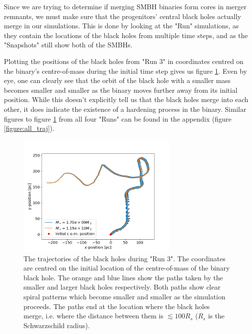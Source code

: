 \documentclass[english, oneside]{HYgradu}
\begin{document}
Since we are trying to determine if merging SMBH binaries form cores in merger remnants, we must make sure that the progenitors' central black holes actually merge in our simulations. This is done by looking at the "Run" simulations, as they contain the locations of the black holes from multiple time steps, and as the "Snapshots" still show both of the SMBHs.

Plotting the positions of the black holes from "Run 3" in coordinates centred on the binary's centre-of-mass during the initial time step gives us figure \ref{figure:run3_traj}. Even by eye, one can clearly see that the orbit of the black hole with a smaller mass becomes smaller and smaller as the binary moves further away from its initial position. While this doesn't explicitly tell us that the black holes merge into each other, it does indicate the existence of a hardening process in the binary. Similar figures to figure \ref{figure:run3_traj} from all four "Runs" can be found in the appendix (figure \ref{figure:all_traj}).

\begin{figure}[h]
	\centering	
	\includegraphics[width=0.7\textwidth]{Run3_Trajectory.png}	
	\caption{The trajectories of the black holes during "Run 3". The coordinates are centred on the initial location of the centre-of-mass of the binary black hole. The orange and blue lines show the paths taken by the smaller and larger black holes respectively. Both paths show clear spiral patterns which become smaller and smaller as the simulation proceeds. The paths end at the location where the black holes merge, i.e. where the distance between them is $\lesssim 100 R_s$ ($R_s$ is the Schwarzschild radius).}
	\label{figure:run3_traj}
\end{figure}
\end{document}
